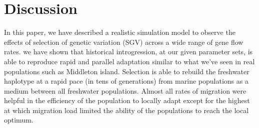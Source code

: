 \documentclass{article}
\begin{document}

\section*{Discussion}
 
In this paper, we have described a realistic simulation model to observe the effects of selection of genetic variation (SGV) across a wide range of gene flow rates.
we have shown that historical introgression, at our given parameter sets, is able to reproduce rapid and parallel adaptation similar to what we've seen in real populations such as Middleton island. 
Selection is able to rebuild the freshwater haplotype at a rapid pace (in tens of generations) from marine populations as a medium between all freshwater populations. 
Almost all rates of migration were helpful in the efficiency of the population to locally adapt except for the highest at which migration load limited the ability of the populations to reach the local optimum. 
\end{document}
